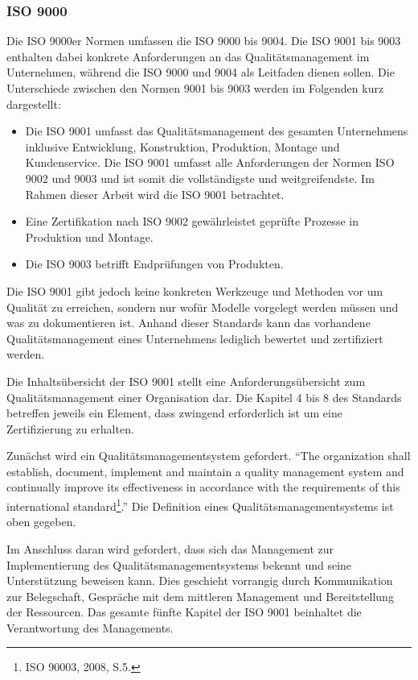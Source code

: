             \subsubsection{ISO 9000}

            Die ISO 9000er Normen umfassen die ISO 9000 bis 9004. Die ISO 9001 bis 9003 enthalten dabei konkrete Anforderungen an das Qualitätsmanagement im Unternehmen, während die ISO 9000 und 9004 als Leitfaden dienen sollen. Die Unterschiede zwischen den Normen 9001 bis 9003 werden im Folgenden kurz dargestellt:
            \begin{itemize}
              \item Die ISO 9001 umfasst das Qualitätsmanagement des gesamten Unternehmens inklusive Entwicklung, Konstruktion, Produktion, Montage und Kundenservice. Die ISO 9001 umfasst alle Anforderungen der Normen ISO 9002 und 9003 und ist somit die vollständigste und weitgreifendste. Im Rahmen dieser Arbeit wird die ISO 9001 betrachtet.
              \item Eine Zertifikation nach ISO 9002 gewährleistet geprüfte Prozesse in Produktion und Montage.
              \item Die ISO 9003 betrifft Endprüfungen von Produkten.
            \end{itemize}

            Die ISO 9001 gibt jedoch keine konkreten Werkzeuge und Methoden vor um Qualität zu erreichen, sondern nur wofür Modelle vorgelegt werden müssen und was zu dokumentieren ist. Anhand dieser Standards kann das vorhandene Qualitätsmanagement eines Unternehmens lediglich bewertet und zertifiziert werden.

            Die Inhaltsübersicht der ISO 9001  stellt eine Anforderungsübersicht zum Qualitätsmanagement einer Organisation dar. Die Kapitel 4 bis 8 des Standards betreffen jeweils ein Element, dass zwingend erforderlich ist um eine Zertifizierung zu erhalten.

            Zunächst wird ein Qualitätsmanagementsystem gefordert. \enquote{The organization shall establish, document, implement and maintain a quality management system and continually improve its effectiveness in accordance with the requirements of this international standard\footnote{ISO 90003, 2008, S.5.}.}
            Die Definition eines Qualitätsmanagementsystems ist oben gegeben.

            Im Anschluss daran wird gefordert, dass sich das Management zur Implementierung des Qualitätsmanagementsystems bekennt und seine Unterstützung beweisen kann. Dies geschieht vorrangig durch Kommunikation zur Belegschaft, Gespräche mit dem mittleren Management und Bereitstellung der Ressourcen. Das gesamte fünfte Kapitel der ISO 9001 beinhaltet die Verantwortung des Managements.

